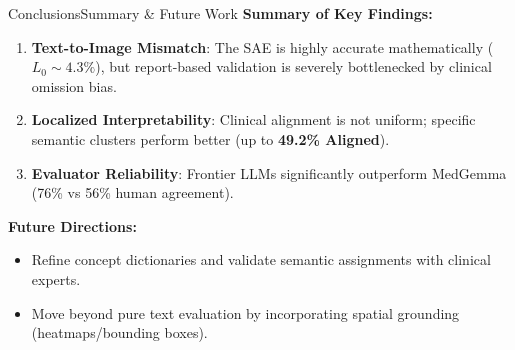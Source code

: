 \begin{frame}{Conclusions}{Summary \& Future Work}
  \textbf{Summary of Key Findings:}
  \begin{enumerate}
    \small
    \item \textbf{Text-to-Image Mismatch}: The SAE is highly accurate mathematically ($L_0 \sim 4.3\%$), but report-based validation is severely bottlenecked by clinical omission bias.
    \item \textbf{Localized Interpretability}: Clinical alignment is not uniform; specific semantic clusters perform better (up to \textbf{49.2\% Aligned}).
    \item \textbf{Evaluator Reliability}: Frontier LLMs significantly outperform MedGemma (76\% vs 56\% human agreement).
  \end{enumerate}

  \vspace{0.2cm}
  \textbf{Future Directions:}
  \begin{itemize}
    \small
    \item Refine concept dictionaries and validate semantic assignments with clinical experts.
    \item Move beyond pure text evaluation by incorporating spatial grounding (heatmaps/bounding boxes).
  \end{itemize}

\end{frame}